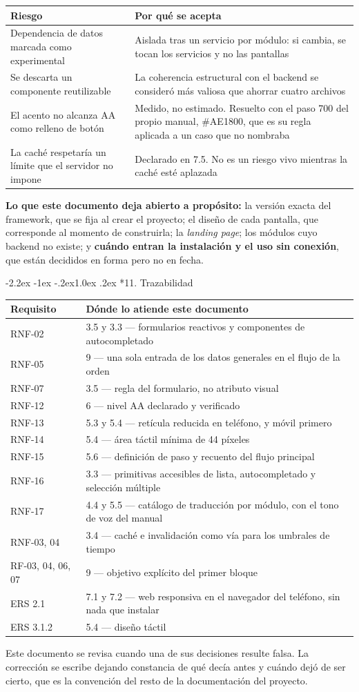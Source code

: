 \documentclass[12pt,a4paper]{article}
\makeatletter
\renewcommand\section{\@startsection{section}{1}{\z@}%
  {-2.2ex \@plus -1ex \@minus -.2ex}{1.0ex \@plus.2ex}%
  {\normalfont\Large\bfseries}}
\newcommand{\sectiontitle}[1]{%
  \section*{#1}
  \addcontentsline{toc}{section}{#1}
}
\makeatother
\begin{document}
\begin{longtable}{p{4.6cm} p{9.2cm}}
\textbf{Riesgo} & \textbf{Por qué se acepta} \\
\hline
\endhead
Dependencia de datos marcada como experimental & Aislada tras un servicio por módulo: si cambia, se tocan los servicios y no las pantallas \\
Se descarta un componente reutilizable & La coherencia estructural con el backend se consideró más valiosa que ahorrar cuatro archivos \\
El acento no alcanza AA como relleno de botón & Medido, no estimado. Resuelto con el paso 700 del propio manual, \#AE1800, que es su regla aplicada a un caso que no nombraba \\
La caché respetaría un límite que el servidor no impone & Declarado en 7.5. No es un riesgo vivo mientras la caché esté aplazada \\
\end{longtable}

\textbf{Lo que este documento deja abierto a propósito:} la versión exacta del
framework, que se fija al crear el proyecto; el diseño de cada pantalla, que
corresponde al momento de construirla; la \textit{landing page}; los módulos
cuyo backend no existe; y \textbf{cuándo entran la instalación y el uso sin
conexión}, que están decididos en forma pero no en fecha.

\sectiontitle{11. Trazabilidad}

\begin{longtable}{p{2.4cm} p{11.4cm}}
\textbf{Requisito} & \textbf{Dónde lo atiende este documento} \\
\hline
\endhead
RNF-02 & 3.5 y 3.3 — formularios reactivos y componentes de autocompletado \\
RNF-05 & 9 — una sola entrada de los datos generales en el flujo de la orden \\
RNF-07 & 3.5 — regla del formulario, no atributo visual \\
RNF-12 & 6 — nivel AA declarado y verificado \\
RNF-13 & 5.3 y 5.4 — retícula reducida en teléfono, y móvil primero \\
RNF-14 & 5.4 — área táctil mínima de 44 píxeles \\
RNF-15 & 5.6 — definición de paso y recuento del flujo principal \\
RNF-16 & 3.3 — primitivas accesibles de lista, autocompletado y selección múltiple \\
RNF-17 & 4.4 y 5.5 — catálogo de traducción por módulo, con el tono de voz del manual \\
RNF-03, 04 & 3.4 — caché e invalidación como vía para los umbrales de tiempo \\
RF-03, 04, 06, 07 & 9 — objetivo explícito del primer bloque \\
ERS 2.1 & 7.1 y 7.2 — web responsiva en el navegador del teléfono, sin nada que instalar \\
ERS 3.1.2 & 5.4 — diseño táctil \\
\end{longtable}

\vspace{1em}

Este documento se revisa cuando una de sus decisiones resulte falsa. La
corrección se escribe dejando constancia de qué decía antes y cuándo dejó de ser
cierto, que es la convención del resto de la documentación del proyecto.
\end{document}
